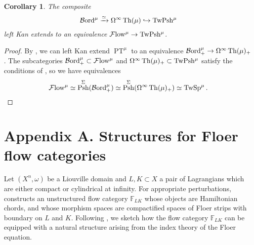 \documentclass[10pt]{amsart}
\numberwithin{equation}{section}
\newtheorem{cor}[prop]{Corollary}
\theoremstyle{definition}
\DeclareMathOperator{\Th}{Th}
\DeclareMathOperator{\Psh}{Psh}
\DeclareMathOperator{\PT}{PT}
\newcommand{\Flow}{\cF\mathrm{low}\vphantom{w}}
\newcommand{\Bord}{\mathcal{B}\mathrm{ord}\vphantom{d}}
\newcommand{\TwShv}{\mathrm{TwPsh}\vphantom{h}}
\newcommand{\TwSp}{\mathrm{TwSp}\vphantom{h}}
\newcommand{\bF}{\mathbb{F}}
\newcommand{\cF}{\mathcal{F}}
\renewcommand{\to}{\mathchoice{\longrightarrow}{\rightarrow}{}{}}
\begin{document}
\begin{cor}\label{cor:Flow=TwShv}
	The composite
	\begin{align*}
		\Bord^{\mu} \xrightarrow{\simeq} \Omega^{\infty}\Th(\mu) \hookrightarrow \TwShv^{\mu}
	\end{align*}
	left Kan extends to an equivalence $\Flow^{\mu} \to \TwShv^{\mu}$.
\end{cor}
\begin{proof}
	By , we can left Kan extend $\PT^{\mu}$ to an equivalence $\Bord^{\mu}_{+} \to \Omega^{\infty}\Th(\mu)_{+}$.
	The subcategories
	$\Bord^{\mu}_{+} \subset \Flow^{\mu}$ and $\Omega^{\infty}\Th(\mu)_{+}\subset \TwShv^{\mu}$ satisfy the conditions of , so we have equivalences
	\begin{align*}
		\Flow^{\mu} \simeq  \Psh^{\Sigma}( \Bord^{\mu}_{+} ) \simeq \Psh^{\Sigma}(\Omega^{\infty}\Th(\mu)_{+})\simeq \TwSp^{\mu} \,.
	\end{align*}
\end{proof}

\section*{Appendix A. Structures for Floer flow categories} \label{sec:appendix}
	Let $(X^{n},\omega)$ be a Liouville domain and $L,K\subset X$ a pair of Lagrangians which are either compact or cylindrical at infinity.
  For appropriate perturbations, \cite{large2021spectral} constructs an unstructured flow category $\bF_{LK}$ whose objects are Hamiltonian chords, and whose morphism spaces are compactified spaces of Floer strips with boundary on $L$ and $K$.
  Following \cite{bonciocat2025floer,porcelli2024spectral}, we sketch how the flow category $\bF_{LK}$ can be equipped with a natural structure arising from the index theory of the Floer equation.
\end{document}
